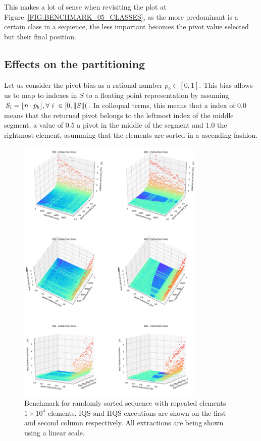 This makes a lot of sense when revisiting the plot at Figure~\ref{FIG:BENCHMARK_05_CLASSES}, as the more predominant is a certain class in a sequence, the less important becomes the pivot value selected but their final position.

\subsection{Effects on the partitioning}

Let us consider the pivot bias as a rational number $p_b \in [0,1]$. This bias allows us to map to indexes in $S$ to a floating point representation by assuming $S_i = \lfloor n\cdot p_{b}  \rfloor, \forall ~i~ \in[0,\lVert S\rVert($. In colloqual terms, this means that a index of $0.0$ means that the returned pivot belongs to the leftmost index of the middle segment, a value of $0.5$ a pivot in the middle of the segment and $1.0$ the rightmost element, asumming that the elements are sorted in a ascending fashion.

\begin{figure}[!ht]
    \centering
    \includegraphics[width=0.8\textwidth]{./fragments/04_experimental_execution/images/01_basebenchmark_06_noise_bias.png}
    \caption{Benchmark for randomly sorted sequence with repeated elements $1\times10^4$ elements. IQS and IIQS executions are shown on the first and second column respectively. All extractions are being shown using a linear scale.}
    \label{FIG:BENCHMARK_06_NOISE_BIAS}
\end{figure}

